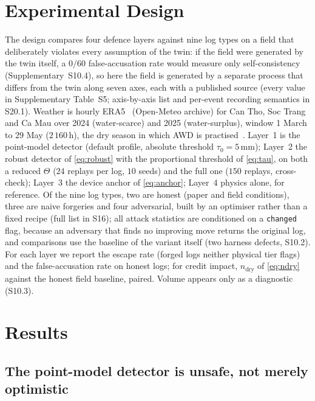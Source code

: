 \section{Experimental Design}
\label{sec:design}

The design compares four defence layers against nine log types on a field that
deliberately violates every assumption of the twin: if the field were generated
by the twin itself, a $0/60$ false-accusation rate would measure only
self-consistency (Supplementary~S10.4), so here the field is generated by a
separate process that
differs from the twin along seven axes, each with a published source (every
value in Supplementary Table~S5; axis-by-axis list and per-event recording
semantics in S20.1). Weather is hourly ERA5~\cite{hersbach2020} (Open-Meteo archive) for Can Tho,
Soc Trang and Ca Mau over 2024 (water-scarce) and 2025 (water-surplus), window
1 March to 29 May ($2\,160$\,h), the dry season in which AWD is
practised~\cite{tuong2003}. Layer~1 is the point-model detector (default profile, absolute
threshold $\tau_0=5$\,mm); Layer~2 the robust detector of \eqref{eq:robust}
with the proportional threshold of \eqref{eq:tau}, on both a reduced
$\Theta$ ($24$ replays per log, $10$ seeds) and the full one ($150$ replays,
cross-check); Layer~3 the device anchor of \eqref{eq:anchor}; Layer~4 physics
alone, for reference. Of the nine log types, two are honest (paper and field conditions), three are naive
forgeries and four adversarial, built by
an optimiser rather than a fixed recipe (full list in S16); all attack
statistics are conditioned on a \texttt{changed} flag, because an adversary
that finds no improving move returns the original log, and comparisons use the
baseline of the variant itself (two harness defects, S10.2). For each layer we
report the escape rate (forged logs neither physical tier flags) and the
false-accusation rate on honest logs; for credit impact, $n_{\mathrm{dry}}$ of
\eqref{eq:ndry} against the honest field baseline, paired. Volume appears only
as a diagnostic (S10.3).

\section{Results}
\label{sec:results}

\subsection{The point-model detector is unsafe, not merely optimistic}

